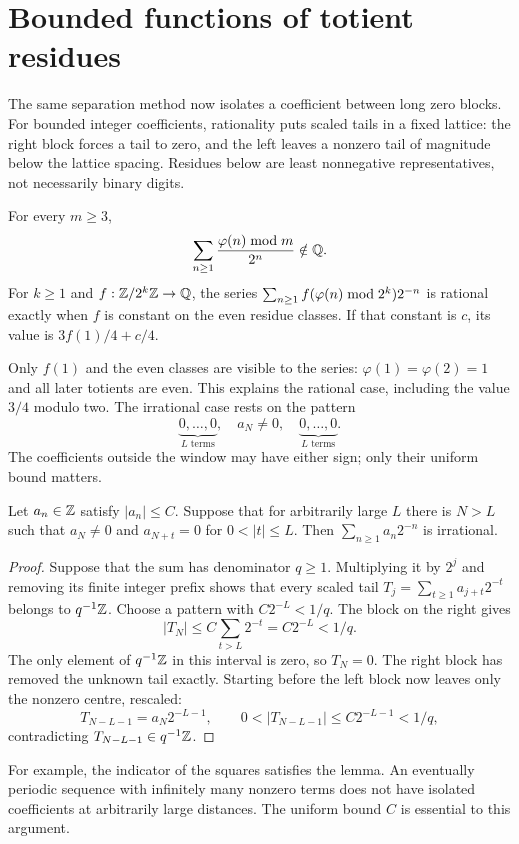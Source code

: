 \documentclass[11pt]{article}
\begin{document}
\section{Bounded functions of totient residues}\label{sec:family}
The same separation method now isolates a coefficient between long
zero blocks. For bounded integer coefficients, rationality puts scaled
tails in a fixed lattice: the right block forces a tail to zero,
and the left leaves a nonzero tail of magnitude below the lattice spacing.
Residues below are least nonnegative representatives, not necessarily
binary digits.
\begin{theorem}\label{res:residueseries}
For every $m\ge3$,
\[
 \sum_{n\ge1}\frac{\varphi(n)\bmod m}{2^n}\notin\mathbb{Q}.
\]
For $k\ge1$ and $f:\mathbb{Z}/2^k\mathbb{Z}\to\mathbb{Q}$, the series
$\sum_{n\ge1}f(\varphi(n)\bmod2^k)2^{-n}$ is rational exactly when $f$ is
constant on the even residue classes. If that constant is $c$, its value is
$3f(1)/4+c/4$.
\end{theorem}
Only $f(1)$ and the even classes are visible to the series:
$\varphi(1)=\varphi(2)=1$ and all later totients are even.
This explains the rational case, including the value $3/4$ modulo
two. The irrational case rests on the pattern
\[
 \underbrace{0,\ldots,0}_{L\text{ terms}},\quad
 a_N\ne0,\quad
 \underbrace{0,\ldots,0}_{L\text{ terms}}.
\]
The coefficients outside the window may have either sign; only their
uniform bound matters.
\begin{lemma}\label{lem:bounded-pulse}
Let $a_n\in\mathbb{Z}$ satisfy $|a_n|\le C$. Suppose that for arbitrarily large $L$
there is $N>L$ such that $a_N\ne0$ and
$a_{N+t}=0$ for $0<|t|\le L$. Then $\sum_{n\ge1}a_n2^{-n}$ is irrational.
\end{lemma}
\begin{proof}
Suppose that the sum has denominator $q\ge1$. Multiplying it by
$2^j$ and removing its finite integer prefix shows that every scaled
tail $T_j=\sum_{t\ge1}a_{j+t}2^{-t}$ belongs to $q^{-1}\mathbb{Z}$.
Choose a pattern with $C2^{-L}<1/q$. The block on the right gives
\[
 |T_N|\le C\sum_{t>L}2^{-t}=C2^{-L}<1/q.
\]
The only element of $q^{-1}\mathbb{Z}$ in this interval is zero, so $T_N=0$.
The right block has removed the unknown tail exactly. Starting before
the left block now leaves only the nonzero centre, rescaled:
\[
 T_{N-L-1}=a_N2^{-L-1},\qquad
 0<|T_{N-L-1}|\le C2^{-L-1}<1/q,
\]
contradicting $T_{N-L-1}\in q^{-1}\mathbb{Z}$.
\end{proof}
For example, the indicator of the squares satisfies the lemma.
An eventually periodic sequence with infinitely many nonzero terms
does not have isolated coefficients at arbitrarily large distances.
The uniform bound $C$ is essential to this argument.
\end{document}

